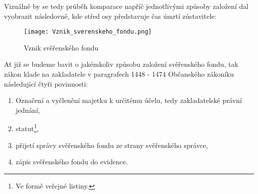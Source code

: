 \documentclass{article}
\begin{document}
Vizuálně by se tedy průběh komparace napříč jednotlivými způsoby založení dal vyobrazit následovně, kde střed osy představuje čas úmrtí zůstavitele:

\begin{figure}[h]
\centering
\texttt{[image: Vznik\_sverenskeho\_fondu.png]}
\caption{Vznik svěřenského fondu}
\label{fig:komparace}
\end{figure}








Ať již se budeme bavit o jakémkoliv způsobu založení svěřenského fondu, tak zákon klade na zakladatele v paragrafech 1448 - 1474 Občanského zákoníku následující čtyři povinnosti:

\begin{enumerate}
\item Označení a vyčlenění majetku k určitému účelu, tedy zakladatelské právní jednání,
\item statut\footnote{Ve formě veřejné listiny.},
\item přijetí správy svěřenského fondu ze strany svěřenského správce,
\item zápis svěřenského fondu do evidence.
\end{enumerate}
\end{document}
